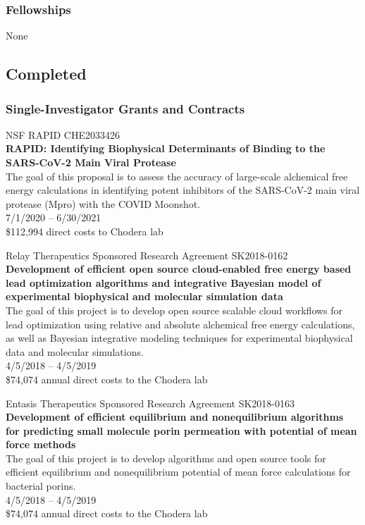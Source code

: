 \documentclass[10pt]{article}
\begin{document}
\subsubsection*{Fellowships}

None

\eject

\subsection*{Completed}

\subsubsection*{Single-Investigator Grants and Contracts}

NSF RAPID CHE2033426\\
{\bf RAPID: Identifying Biophysical Determinants of Binding to the SARS-CoV-2 Main Viral Protease}\\
The goal of this proposal is to assess the accuracy of large-scale alchemical free energy calculations in identifying potent inhibitors of the SARS-CoV-2 main viral protease (Mpro) with the COVID Moonshot. \\
7/1/2020 -- 6/30/2021\\
\$112,994 direct costs to Chodera lab

\vspace{1.5ex}


Relay Therapeutics Sponsored Research Agreement SK2018-0162 \\
{\bf Development of efficient open source cloud-enabled free energy based lead optimization algorithms and integrative Bayesian model of experimental biophysical and molecular simulation data} \\
The goal of this project is to develop open source scalable cloud workflows for lead optimization using relative and absolute alchemical free energy calculations, as well as Bayesian integrative modeling techniques for experimental biophysical data and molecular simulations. \\
4/5/2018 -- 4/5/2019 \\
\$74,074 annual direct costs to the Chodera lab

\vspace{1.5ex}

Entasis Therapeutics Sponsored Research Agreement SK2018-0163 \\
{\bf Development of efficient equilibrium and nonequilibrium algorithms for predicting small molecule porin permeation with potential of mean force methods} \\
The goal of this project is to develop algorithms and open source tools for efficient equilibrium and nonequilibrium potential of mean force calculations for bacterial porins.\\
4/5/2018 -- 4/5/2019 \\
\$74,074 annual direct costs to the Chodera lab
\end{document}
